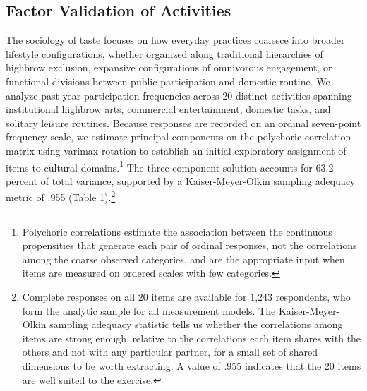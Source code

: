 \documentclass[
  12pt
]{article}
\author{}
\date{}
\begin{document}
\hypertarget{factor-validation-of-activities}{%
\subsection{Factor Validation of Activities}\label{factor-validation-of-activities}}

The sociology of taste focuses on how everyday practices coalesce into broader lifestyle configurations, whether organized along traditional hierarchies of highbrow exclusion, expansive configurations of omnivorous engagement, or functional divisions between public participation and domestic routine. We analyze past-year participation frequencies across 20 distinct activities spanning institutional highbrow arts, commercial entertainment, domestic tasks, and solitary leisure routines. Because responses are recorded on an ordinal seven-point frequency scale, we estimate principal components on the polychoric correlation matrix using varimax rotation to establish an initial exploratory assignment of items to cultural domains.\footnote{Polychoric correlations estimate the association between the continuous propensities that generate each pair of ordinal responses, not the correlations among the coarse observed categories, and are the appropriate input when items are measured on ordered scales with few categories.}  The three-component solution accounts for 63.2 percent of total variance, supported by a Kaiser-Meyer-Olkin sampling adequacy metric of .955 (Table 1).\footnote{Complete responses on all 20 items are available for 1,243 respondents, who form the analytic sample for all measurement models. The Kaiser-Meyer-Olkin sampling adequacy statistic tells us whether the correlations among items are strong enough, relative to the correlations each item shares with the others and not with any particular partner, for a small set of shared dimensions to be worth extracting. A value of .955 indicates that the 20 items are well suited to the exercise.} 
\end{document}

